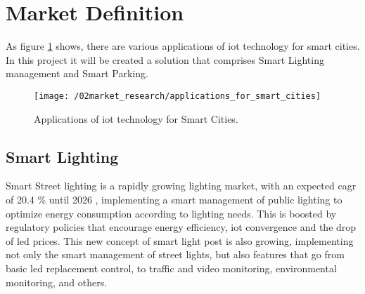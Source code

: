 \section{Market Definition}
%
%
%

As figure \ref{fig:smart_cities_sols} shows, there are various applications of \ac{iot} technology for smart cities. In this project it will be created a solution that comprises Smart Lighting management and Smart Parking.

\begin{figure}[ht]
	\centering
	\texttt{[image: /02market\_research/applications\_for\_smart\_cities]}
	\caption{Applications of \ac{iot} technology for Smart Cities. \cite{smart_cities_solutions}}
	\label{fig:smart_cities_sols}
\end{figure}

\subsection{Smart Lighting}
Smart Street lighting is a rapidly growing lighting market, with an expected \ac{cagr} of 20.4 \% until 2026 \cite{smart_light_market}, implementing a smart management of public lighting to optimize energy consumption according to lighting needs. This is boosted by regulatory policies that encourage energy efficiency, \ac{iot} convergence and the drop of \ac{led} prices. This new concept of smart light post is also growing, implementing not only the smart management of street lights, but also features that go from basic \ac{led} replacement control, to traffic and video monitoring, environmental monitoring, and others. 

